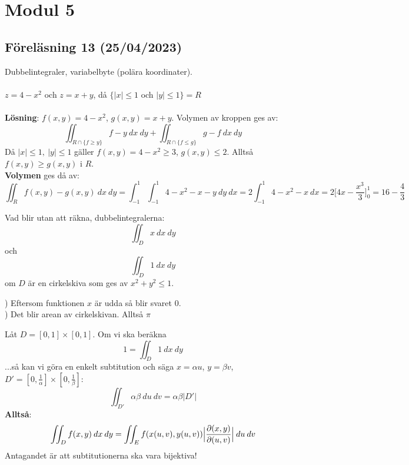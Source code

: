 \documentclass{report}
\begin{document}
\chapter{Modul 5}
\section{Föreläsning 13 (25/04/2023)}
Dubbelintegraler, variabelbyte (polära koordinater).\\\\

{
$ z = 4 - x^2 $ och $ z = x+y $, då $\{ |x| \le 1 $ och $ |y| \le 1\}= R $ \\\\

	\textbf{Lösning}: $ f(x,y) = 4-x^2 $, $ g(x,y) = x +y $. Volymen av kroppen ges av:
	\begin{equation*}
		\iint_{R \cap \{f \ge y\}}^{} f-y \: dx   \: dy + \iint_{R \cap \{ f \le g \}}^{} g-f \: dx  \: dy  
	\end{equation*}
	Då $ |x| \le 1, \: |y| \le 1 $ gäller $ f(x,y) = 4-x^2 \ge 3 $, $ g(x,y) \le 2 $. Alltså $ f(x,y) \ge g(x,y) $ i $ R $.\\
	\textbf{Volymen} ges då av:
\begin{equation*}
	\iint_{R}^{} f(x,y) - g(x,y) \: dx   \: dy = \int_{-1}^{1} \int_{-1}^{1} 4-x^2-x-y \: dy  \: dx = 2 \int_{-1}^{1} 4-x^2-x \: dx = 2 \bigl[ 4x - \frac{x^3}{3}   \bigr]_{0}^{1} = 16 - \frac{4}{3}    
\end{equation*}
}

\vspace{20pt}
\qs{}
{
Vad blir utan att räkna, dubbelintegralerna:
\begin{equation*}
\iint_{D}^{} x \: dx   \: dy
\end{equation*}
och
\begin{equation*}
\iint_{D}^{} 1 \: dx   \: dy 
\end{equation*}
om $ D $ är en cirkelskiva som ges av $ x^2 + y^2 \le 1 $.
}

)
Eftersom funktionen $ x $ är udda så blir svaret 0.\\

)
Det blir arean av cirkelskivan. Alltså $ \pi $ 

\vspace{20pt}
{
	Låt $ D = [0,1] \times [0,1] $. Om vi ska beräkna
\begin{equation*}
1 = \iint_{D}^{} 1 \: dx   \: dy
\end{equation*}
	...så kan vi göra en enkelt subtitution och säga $ x = \alpha u $, $ y = \beta v $, $ D' = [0, \frac{1}{ \alpha} ] \times [0, \frac{1}{ \beta} ]$:
\begin{equation*}
\iint_{D'}^{} \alpha \beta \: du   \: dv = \alpha \beta |D'|
	\end{equation*}
\textbf{Alltså}:
\begin{equation*}
\iint_{D}^{} f(x,y) \: dx  \: dy = \iint_{E}^{} f(x(u,v), y(u,v)) \Bigl| \frac{\partial(x,y)}{\partial(u,v)}\Bigr| \: du  \: dv
\end{equation*}
Antagandet är att subtitutionerna ska vara bijektiva! 
}
\end{document}
